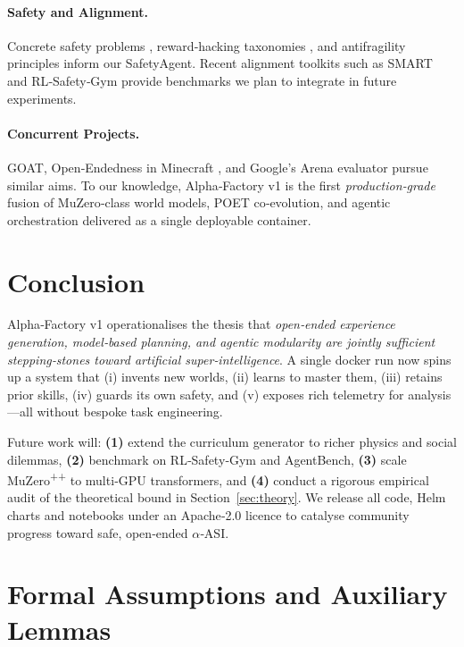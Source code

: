 \paragraph{Safety and Alignment.}
Concrete safety problems \cite{amodei2016concrete},
reward‑hacking taxonomies \cite{hadfield2021neurips},
and antifragility principles \cite{taleb2012antifragile,richter2021antifragile}
inform our SafetyAgent.  Recent alignment toolkits such as SMART
\cite{hofmann2022smart} and RL‑Safety‑Gym \cite{zahavy2021safetygym} provide
benchmarks we plan to integrate in future experiments.

\paragraph{Concurrent Projects.}
GOAT, Open‑Endedness in Minecraft \cite{bakhtin2022openended},
and Google’s Arena evaluator \cite{kilcher2023arena} pursue similar aims.
To our knowledge, Alpha‑Factory v1 is the first \emph{production‑grade}
fusion of MuZero‑class world models, POET co‑evolution, and agentic
orchestration delivered as a single deployable container.

\section{Conclusion}

Alpha‑Factory v1 operationalises the thesis that \emph{open‑ended
experience generation, model‑based planning, and agentic modularity are
jointly sufficient stepping‑stones toward artificial super‑intelligence}.
A single docker run now spins up a system that
(i) invents new worlds, (ii) learns to master them, (iii) retains prior
skills, (iv) guards its own safety, and (v) exposes rich telemetry for
analysis---all without bespoke task engineering.

Future work will: \textbf{(1)} extend the curriculum generator to richer
physics and social dilemmas, \textbf{(2)} benchmark on RL‑Safety‑Gym and
AgentBench, \textbf{(3)} scale MuZero\textsuperscript{++} to multi‑GPU
transformers, and \textbf{(4)} conduct a rigorous empirical audit of the
theoretical bound in Section~\ref{sec:theory}.
We release all code, Helm charts and notebooks under an Apache‑2.0 licence
to catalyse community progress toward safe, open‑ended $\alpha$‑ASI.

\appendix
\section{Formal Assumptions and Auxiliary Lemmas}\label{app:assumptions-detail}

